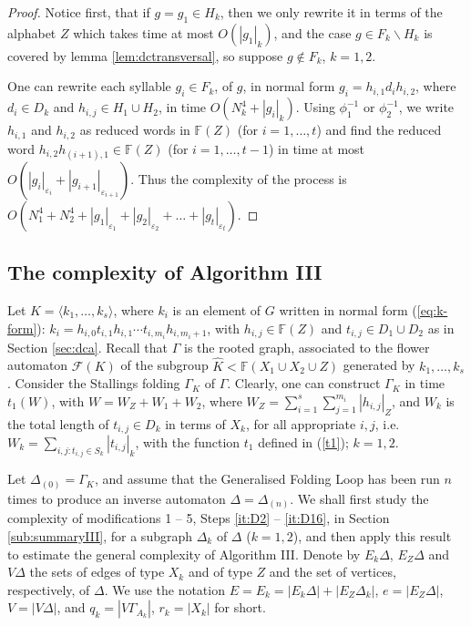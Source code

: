 \documentclass[a4paper,12pt]{article}
\newcommand{\G}{\Gamma }
\newcommand{\D}{\Delta }
\newcommand{\e}{\varepsilon }
\newcommand{\T}{\Theta }
\newcommand{\cF}{{\cal{F}}}
\numberwithin{equation}{section}
\numberwithin{figure}{section}
\newcommand{\FF}{\ensuremath{\mathbb{F}}}
\renewcommand{\cF}{\mathcal{F}}
\newcommand{\la}{\langle}
\newcommand{\ra}{\rangle}
\begin{document}
\begin{proof} Notice first, that if $g = g_1 \in H_k$, then we
only rewrite it in terms of the  alphabet $Z$ which takes time at most
$O(|g_1|_k)$, and the case $g \in F_k \smallsetminus H_k$ is
covered by lemma \ref{lem:dctransversal}, so suppose $g \notin
F_k$, $k=1,2$.

One can rewrite each syllable $g_i \in F_k$, of $g$, in normal form
$g_i=h_{i,1}d_ih_{i,2}$, where $d_i\in D_k$ and $h_{i,j}\in H_1\cup
H_2$, in time  $O(N^4_k + |g_i|_k)$. Using $\phi_1^{-1}$ or
$\phi_2^{-1}$, we write $h_{i,1}$ and $h_{i,2}$ as reduced words
in $\FF(Z)$ (for $i=1, \ldots, t$) and find the reduced word
$h_{i,2}h_{(i+1),1}\in \FF(Z)$ (for $i=1, \ldots, t-1$) in time at
most $O(|g_i|_{\e_i}+|g_{i+1}|_{\e_{i+1}})$.  Thus the
complexity of the process is $O(N^4_1+ N^4_2 +
|g_1|_{\e_1}+|g_2|_{\e_2}+ \ldots +|g_t|_{\e_t})$. \end{proof}


\subsection{The complexity of Algorithm III}\label{sub:resolution}

Let $K=\la k_1, \ldots , k_s\ra$, where $k_i$ is an element of $G$
written in normal form (\ref{eq:k-form}): $k_i=
h_{i,0}t_{i,1}h_{i,1}\cdots t_{i,m_i}h_{i,m_i+1}$, with
$h_{i,j}\in \FF(Z)$ and $t_{i,j}\in D_1\cup D_2$ as in Section
\ref{sec:dca}. Recall that $\G$ is the rooted graph, associated to
the flower automaton $\cF(K)$ of the subgroup $\hat K < \FF(X_1\cup
X_2 \cup Z)$ generated by $k_1, \ldots , k_s$.
Consider the Stallings folding $\G_K$ of $\G$. Clearly, one can
construct $\G_K$ in time  $t_1(W)$, with $W = W_Z+W_1+W_2$,
 where $W_Z =
\mathop{\sum}\limits_{i=1}^{s}
\mathop{\sum}\limits_{j=1}^{m_i}|h_{i,j}|_Z$, and $W_k$ is the
total length of $t_{i,j} \in D_k$ in terms of $X_k$, for all
appropriate $i,j$, i.e. $W_k = \mathop{\sum}\limits_{i,j:
t_{i,j}\in S_k} |t_{i,j}|_k$, with the function $t_1$ defined in
(\ref{t1}); $k=1,2$.

Let $\D_{(0)} = \G_K$,
 and assume that the Generalised Folding Loop has been run $n$ times to produce an
inverse automaton $\D=\D_{(n)}$.
We shall
first study  the complexity of modifications 1 -- 5, 
Steps  \ref{it:D2} -- \ref{it:D16}, in Section \ref{sub:summaryIII},
for a subgraph $\D_k$ of $\D$ ($k=1,2$), and then apply this result
to estimate the general complexity of Algorithm III.  Denote by $E_k
\D$, $E_Z \D$ and $V\D$ the sets of edges of type $X_k$ and of
type $Z$ and the set of vertices, respectively, of  $\D$.
 We use the notation $E=E_k = |E_k \D| + |E_Z \D_k|$, $e = |E_Z \D|$, $V = |V \D|$, and $q_k = |V
\G_{A_k}|$, $r_k = |X_k|$ for short.
\end{document}
